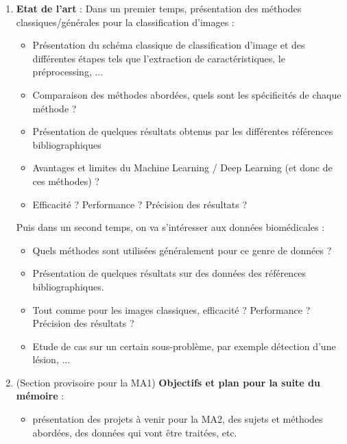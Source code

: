 \documentclass{article}
\begin{document}
\begin{enumerate}
\item \textbf{Etat de l'art} : 
Dans un premier temps, présentation des méthodes classiques/générales pour la classification d'images : 
\begin{itemize}
\item Présentation du schéma classique de classification d'image et des différentes étapes tels que l'extraction de caractéristiques, le préprocessing, ...  
\item Comparaison des méthodes abordées, quels sont les spécificités de chaque méthode ? 
\item Présentation de quelques résultats obtenus par les différentes références bibliographiques 
\item Avantages et limites du Machine Learning / Deep Learning (et donc de ces méthodes) ?
\item Efficacité ? Performance ? Précision des résultats ?
\end{itemize}

Puis dans un second temps, on va s'intéresser aux données biomédicales : 
\begin{itemize}
\item Quels méthodes sont utilisées généralement pour ce genre de données ? 
\item Présentation de quelques résultats sur des données des références bibliographiques. 
\item Tout comme pour les images classiques, efficacité ? Performance ? Précision des résultats ?
\item Etude de cas sur un certain sous-problème, par exemple détection d'une lésion, ...
\end{itemize}

\item (Section provisoire pour la MA1) \textbf{Objectifs et plan pour la suite du mémoire} : 
\begin{itemize}
\item présentation des projets à venir pour la MA2, des sujets et méthodes abordées, des données qui vont être traitées, etc. 
\end{itemize}

\end{enumerate} 
\end{document}
